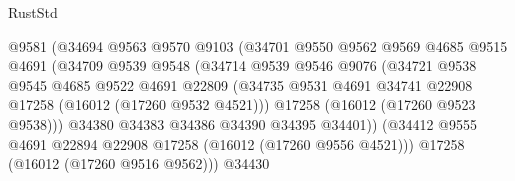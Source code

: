 \begin{lexlean}{RustStd}
\begin{coremodule}
                                    @9581
                                    (@34694
                                      @9563
                                      @9570
                                      @9103
                                      (@34701
                                        @9550
                                        @9562
                                        @9569
                                        @4685
                                        @9515
                                        @4691
                                        (@34709
                                          @9539
                                          @9548
                                          (@34714
                                            @9539
                                            @9546
                                            @9076
                                            (@34721
                                              @9538
                                              @9545
                                              @4685
                                              @9522
                                              @4691
                                              @22809
                                              (@34735
                                                @9531
                                                @4691
                                                @34741
                                                @22908
                                                @17258
                                                (@16012 (@17260 @9532 @4521)))
                                              @17258
                                              (@16012 (@17260 @9523 @9538)))
                                            @34380
                                            @34383
                                            @34386
                                            @34390
                                            @34395
                                            @34401))
                                        (@34412
                                          @9555
                                          @4691
                                          @22894
                                          @22908
                                          @17258
                                          (@16012 (@17260 @9556 @4521)))
                                        @17258
                                        (@16012 (@17260 @9516 @9562)))
                                      @34430

\end{coremodule}
\end{lexlean}

